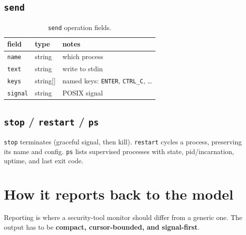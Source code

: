 \documentclass[11pt]{article}
\begin{document}
\subsection{\texttt{send}}

\begin{table}[ht]
\centering
\small
\begin{tabular}{lll}
\toprule
field & type & notes \\
\midrule
\texttt{name} & string & which process \\
\texttt{text} & string & write to stdin \\
\texttt{keys} & string[] & named keys: \texttt{ENTER}, \texttt{CTRL\_C}, \ldots \\
\texttt{signal} & string & POSIX signal \\
\bottomrule
\end{tabular}
\caption{\texttt{send} operation fields.}
\label{tab:send}
\end{table}

\subsection{\texttt{stop} / \texttt{restart} / \texttt{ps}}

\texttt{stop} terminates (graceful signal, then kill). \texttt{restart} cycles a
process, preserving its name and config. \texttt{ps} lists supervised processes
with state, pid/incarnation, uptime, and last exit code.

\section{How it reports back to the model}

Reporting is where a security-tool monitor should differ from a generic one. The
output has to be \textbf{compact, cursor-bounded, and signal-first}.
\end{document}
